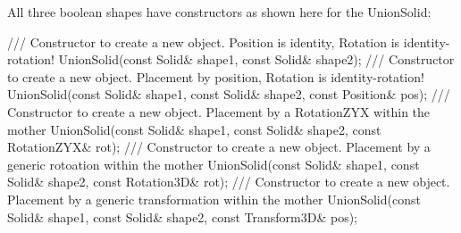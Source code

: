 \documentclass[10pt,a4paper]{article}
\begin{document}
\noindent
All three boolean shapes
have constructors as shown here for the UnionSolid:
\begin{code}
  /// Constructor to create a new object. Position is identity, Rotation is identity-rotation!
  UnionSolid(const Solid& shape1, const Solid& shape2);
  /// Constructor to create a new object. Placement by position, Rotation is identity-rotation!
  UnionSolid(const Solid& shape1, const Solid& shape2, const Position& pos);
  /// Constructor to create a new object. Placement by a RotationZYX within the mother
  UnionSolid(const Solid& shape1, const Solid& shape2, const RotationZYX& rot);
  /// Constructor to create a new object. Placement by a generic rotoation within the mother
  UnionSolid(const Solid& shape1, const Solid& shape2, const Rotation3D& rot);
  /// Constructor to create a new object. Placement by a generic transformation within the mother
  UnionSolid(const Solid& shape1, const Solid& shape2, const Transform3D& pos);
\end{code}
\end{document}
